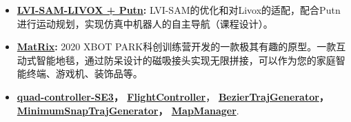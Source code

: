 %
%


 
			


\begin{itemize}
	\item \textbf{\href{https://github.com/jianhengLiu/LVI-SAM-LIVOX}{LVI-SAM-LIVOX + Putn}:} LVI-SAM的优化和对Livox的适配，配合Putn进行运动规划，实现仿真中机器人的自主导航（课程设计）。\\
	\vspace{-8pt}
	\item \textbf{\href{https://www.bilibili.com/video/BV1gb4y127by?share_source=copy_web}{MatRix}:} 2020 XBOT PARK科创训练营开发的一款极其有趣的原型。一款互动式智能地毯，通过防呆设计的磁吸接头实现无限拼接，可以作为您的家庭智能终端、游戏机、装饰品等。\\
	\vspace{-8pt}
	\item \textbf{\href{https://github.com/jianhengLiu/quad_controller_SE3}{quad-controller-SE3}， \href{https://github.com/jianhengLiu/FlightController}{FlightController}}， \textbf{\href{https://github.com/jianhengLiu/BezierTrajGenerator}{BezierTrajGenerator}， \href{https://github.com/jianhengLiu/MinimumSnapTrajGenerator}{MinimumSnapTrajGenerator}，
	\href{https://github.com/jianhengLiu/MapManager}{MapManager}}.
\end{itemize}